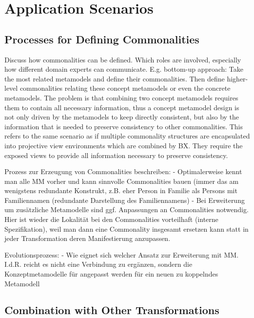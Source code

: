 \section{Application Scenarios}
\label{chap:improvement:application}

\subsection{Processes for Defining Commonalities}

Discuss how commonalities can be defined. Which roles are involved, especially how different domain experts can communicate. E.g. bottom-up approach: Take the most related metamodels and define their commonalities. Then define higher-level commonalities relating these concept metamodels or even the concrete metamodels. 
The problem is that combining two concept metamodels requires them to contain all necessary information, thus a concept metamodel design is not only driven by the metamodels to keep directly consistent, but also by the information that is needed to preserve consistency to other commonalities. This refers to the same scenario as if multiple commonality structures are encapsulated into projective view environments which are combined by BX. They require the exposed views to provide all information necessary to preserve consistency.


Prozess zur Erzeugung von Commonalities beschreiben:
- Optimalerweise kennt man alle MM vorher und kann sinnvolle Commonalities bauen (immer das am wenigstens redundante Konstrukt, z.B. eher Person in Familie als Persons mit Familiennamen (redundante Darstellung des Familiennamens)
- Bei Erweiterung um zusätzliche Metamodelle sind ggf. Anpassungen an Commonalities notwendig. Hier ist wieder die Lokalität bei den Commonalities vorteilhaft (interne Spezifikation), weil man dann eine Commonality insgesamt ersetzen kann statt in jeder Transformation deren Manifestierung anzupassen.

Evolutionsprozess:
- Wie eignet sich welcher Ansatz zur Erweiterung mit MM. I.d.R. reicht es nicht eine Verbindung zu ergänzen, sondern die Konzeptmetamodelle für angepasst werden für ein neuen zu koppelndes Metamodell



\subsection{Combination with Other Transformations}


